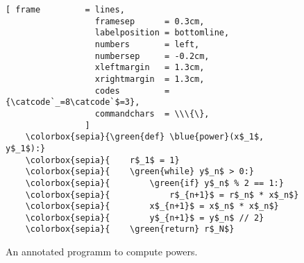 \begin{figure}[!h]
\centering
\begin{Verbatim}[ frame         = lines, 
                  framesep      = 0.3cm, 
                  labelposition = bottomline,
                  numbers       = left,
                  numbersep     = -0.2cm,
                  xleftmargin   = 1.3cm,
                  xrightmargin  = 1.3cm,
                  codes         = {\catcode`_=8\catcode`$=3},
                  commandchars  = \\\{\},
                ]
    \colorbox{sepia}{\green{def} \blue{power}(x$_1$, y$_1$):}
    \colorbox{sepia}{    r$_1$ = 1}
    \colorbox{sepia}{    \green{while} y$_n$ > 0:}
    \colorbox{sepia}{        \green{if} y$_n$ % 2 == 1:}
    \colorbox{sepia}{            r$_{n+1}$ = r$_n$ * x$_n$}
    \colorbox{sepia}{        x$_{n+1}$ = x$_n$ * x$_n$}
    \colorbox{sepia}{        y$_{n+1}$ = y$_n$ // 2}
    \colorbox{sepia}{    \green{return} r$_N$}
\end{Verbatim}
\vspace*{-0.3cm}
\caption{An annotated programm to compute powers.}
\label{fig:power-iterative-annotated.stlx}
\end{figure} %

